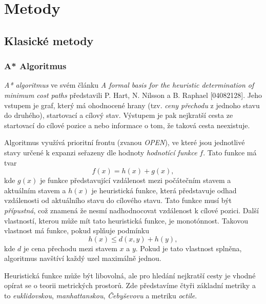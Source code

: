 \chapter{Metody}
\section{Klasické metody}
\subsection{A* Algoritmus}\label{sec:Astar}
\emph{A* algoritmus} ve svém článku \emph{A formal basis for the heuristic determination of minimum cost paths} představili P. Hart, N. Nilsson a B. Raphael [04082128]. Jeho vstupem je graf, který má ohodnocené hrany (tzv. \emph{ceny přechodu} z jednoho stavu do druhého), startovací a cílový stav. Výstupem je pak nejkratší cesta ze startovací do cílové pozice a nebo informace o tom, že taková cesta neexistuje. 

Algoritmus využívá prioritní frontu (zvanou \emph{OPEN}), ve které jsou jednotlivé stavy určené k expanzi seřazeny dle hodnoty \emph{hodnotící funkce} $f$. Tato funkce má tvar
\begin{equation}
	f\left(x\right) = h\left(x\right) + g\left(x\right),
\end{equation}
kde $ g\left(x\right)$ je funkce představující vzdálenost mezi počátečním stavem a aktuálním stavem a $h\left(x\right)$ je heuristická funkce, která představuje odhad vzdálenosti od aktuálního stavu do cílového stavu. Tato funkce musí být \emph{přípustná}, což znamená že nesmí nadhodnocovat vzdálenost k cílové pozici. Další vlastností, kterou může mít tato heuristická funkce, je monotónnost. Takovou vlastnost má funkce, pokud splňuje podmínku
\begin{equation}
	h\left(x\right)\leq d\left(x,y\right) + h\left(y\right),
\end{equation}
kde $d$ je cena přechodu mezi stavem $x$ a $y$. Pokud je tato vlastnost splněna, algoritmus navštíví každý uzel maximálně jednou.

Heuristická funkce může být libovolná, ale pro hledání nejkratší cesty je vhodné opírat se o teorii metrických prostorů. Zde představíme čtyři základní metriky a to \emph{euklidovskou}, \emph{manhattanskou}, \emph{Čebyševovu} a metriku \emph{octile}. 

